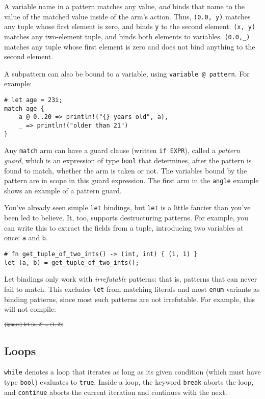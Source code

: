 \documentclass[]{article}
\begin{document}
A variable name in a pattern matches any value, \emph{and} binds that
name to the value of the matched value inside of the arm's action. Thus,
\texttt{(0.0, y)} matches any tuple whose first element is zero, and
binds \texttt{y} to the second element. \texttt{(x, y)} matches any
two-element tuple, and binds both elements to variables.
\texttt{(0.0,\_)} matches any tuple whose first element is zero and does
not bind anything to the second element.

A subpattern can also be bound to a variable, using
\texttt{variable @ pattern}. For example:

\begin{verbatim}
# let age = 23i;
match age {
    a @ 0..20 => println!("{} years old", a),
    _ => println!("older than 21")
}
\end{verbatim}

Any \texttt{match} arm can have a guard clause (written
\texttt{if EXPR}), called a \emph{pattern guard}, which is an expression
of type \texttt{bool} that determines, after the pattern is found to
match, whether the arm is taken or not. The variables bound by the
pattern are in scope in this guard expression. The first arm in the
\texttt{angle} example shows an example of a pattern guard.

You've already seen simple \texttt{let} bindings, but \texttt{let} is a
little fancier than you've been led to believe. It, too, supports
destructuring patterns. For example, you can write this to extract the
fields from a tuple, introducing two variables at once: \texttt{a} and
\texttt{b}.

\begin{verbatim}
# fn get_tuple_of_two_ints() -> (int, int) { (1, 1) }
let (a, b) = get_tuple_of_two_ints();
\end{verbatim}

Let bindings only work with \emph{irrefutable} patterns: that is,
patterns that can never fail to match. This excludes \texttt{let} from
matching literals and most \texttt{enum} variants as binding patterns,
since most such patterns are not irrefutable. For example, this will not
compile:

\textsubscript{\textsubscript{\sout{\{ignore\} let (a, 2) = (1, 2);}}}

\subsection{Loops}\label{loops}

\texttt{while} denotes a loop that iterates as long as its given
condition (which must have type \texttt{bool}) evaluates to
\texttt{true}. Inside a loop, the keyword \texttt{break} aborts the
loop, and \texttt{continue} aborts the current iteration and continues
with the next.
\end{document}
